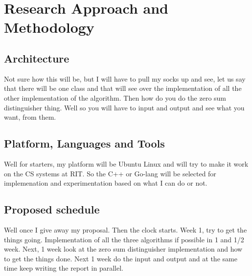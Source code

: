 \chapter{Research Approach and Methodology}







\section{Architecture}
Not sure how this will be, but I will have to pull my socks up and see, let us say that there will be one class
and that will see over the implementation of all the other implementation of the algorithm. Then how do you do the
zero sum distinguisher thing. Well so you will have to input and output and see what you want, from them.

\section{Platform, Languages and Tools}
Well for starters, my platform will be Ubuntu Linux and will try to make it work on the CS systems at RIT. So the
C++ or Go-lang will be selected for implemenation and experimentation based on what I can do or not.

\section{Proposed schedule}
Well once I give away my proposal. Then the clock starts. Week 1, try to get the things going. Implementation of all
the three algorithms if possible in 1 and 1/2 week. Next, 1 week look at the zero sum distinguisher implementation
and how to get the things done. Next 1 week do the input and output and at the same time keep writing the report in
parallel.
